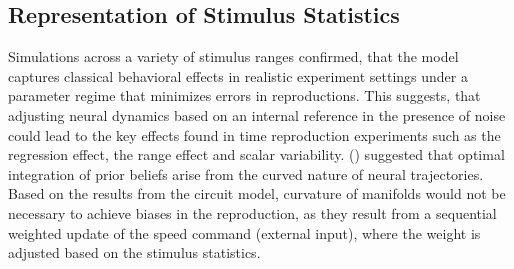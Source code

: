 \documentclass[10pt]{article}
\begin{document}
\subsection{Representation of Stimulus Statistics}
Simulations across a variety of stimulus ranges confirmed, that the model captures classical behavioral effects in realistic experiment settings under a parameter regime that minimizes errors in reproductions. %
This suggests, that adjusting neural dynamics based on an internal reference in the presence of noise could lead to the key effects found in time reproduction experiments such as the regression effect, the range effect and scalar variability. 
\citeauthor{Sohn2019} (\citeyear{Sohn2019}) suggested that optimal integration of prior beliefs arise from the curved nature of neural trajectories. Based on the results from the circuit model, curvature of manifolds would not be necessary to achieve biases in the reproduction, as they result from a sequential weighted update of the speed command (external input), where the weight is adjusted based on the stimulus statistics. 
\end{document}
